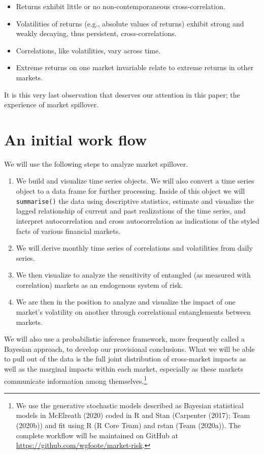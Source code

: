 \documentclass{article}
\begin{document}
\begin{itemize}
\item
  Returns exhibit little or no non-contemporaneous cross-correlation.
\item
  Volatilities of returns (e.g., absolute values of returns) exhibit
  strong and weakly decaying, thus persistent, cross-correlations.
\item
  Correlations, like volatilities, vary across time.
\item
  Extreme returns on one market invariable relate to extreme returns in
  other markets.
\end{itemize}

It is this very last observation that deserves our attention in this
paper; the experience of market spillover.

\hypertarget{an-initial-work-flow}{%
\section{An initial work flow}\label{an-initial-work-flow}}

We will use the following steps to analyze market spillover.

\begin{enumerate}
\def\labelenumi{\arabic{enumi}.}
\item
  We build and visualize time series objects. We will also convert a
  time series object to a data frame for further processing. Inside of
  this object we will \texttt{summarise()} the data using descriptive
  statistics, estimate and visualize the lagged relationship of current
  and past realizations of the time series, and interpret
  autocorrelation and cross autocorrelation as indications of the styled
  facts of various financial markets.
\item
  We will derive monthly time series of correlations and volatilities
  from daily series.
\item
  We then visualize to analyze the sensitivity of entangled (as measured
  with correlation) markets as an endogenous system of risk.
\item
  We are then in the position to analyze and visualize the impact of one
  market's volatility on another through correlational entanglements
  between markets.
\end{enumerate}

We will also use a probabilistic inference framework, more frequently
called a Bayesian approach, to develop our provisional conclusions. What
we will be able to pull out of the data is the full joint distribution
of cross-market impacts as well as the marginal impacts within each
market, especially as these markets communicate information among
themselves.\footnote{We use the generative stochastic models described
  as Bayesian statistical models in McElreath (2020) coded in R and Stan
  (Carpenter (2017); Team (2020b)) and fit using R (R Core Team) and
  rstan (Team (2020a)). The complete workflow will be maintained on
  GitHub at \url{https://github.com/wgfoote/market-risk}.}
\end{document}
